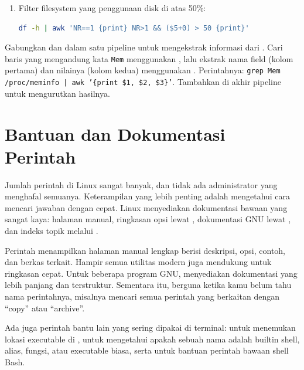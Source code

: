 \begin{enumerate}
    \item Filter filesystem yang penggunaan disk di atas 50\%:
\begin{lstlisting}[language=bash, caption={Filter dengan kondisi awk}]
df -h | awk 'NR==1 {print} NR>1 && ($5+0) > 50 {print}'
\end{lstlisting}
\end{enumerate}

\begin{challengebox}
Gabungkan  dan  dalam satu pipeline untuk mengekstrak informasi dari . Cari baris yang mengandung kata \texttt{Mem} menggunakan , lalu ekstrak nama field (kolom pertama) dan nilainya (kolom kedua) menggunakan . Perintahnya: \texttt{grep Mem /proc/meminfo | awk '\{print \$1, \$2, \$3\}'}. Tambahkan  di akhir pipeline untuk mengurutkan hasilnya.
\end{challengebox}

\section{Bantuan dan Dokumentasi Perintah}
\label{sec:command-documentation}

Jumlah perintah di Linux sangat banyak, dan tidak ada administrator yang menghafal semuanya. Keterampilan yang lebih penting adalah mengetahui cara mencari jawaban dengan cepat. Linux menyediakan dokumentasi bawaan yang sangat kaya: halaman manual, ringkasan opsi lewat , dokumentasi GNU lewat , dan indeks topik melalui .

Perintah  menampilkan halaman manual lengkap berisi deskripsi, opsi, contoh, dan berkas terkait. Hampir semua utilitas modern juga mendukung  untuk ringkasan cepat. Untuk beberapa program GNU,  menyediakan dokumentasi yang lebih panjang dan terstruktur. Sementara itu,  berguna ketika kamu belum tahu nama perintahnya, misalnya mencari semua perintah yang berkaitan dengan ``copy'' atau ``archive''.

Ada juga perintah bantu lain yang sering dipakai di terminal:  untuk menemukan lokasi executable di ,  untuk mengetahui apakah sebuah nama adalah builtin shell, alias, fungsi, atau executable biasa, serta  untuk bantuan perintah bawaan shell Bash.

